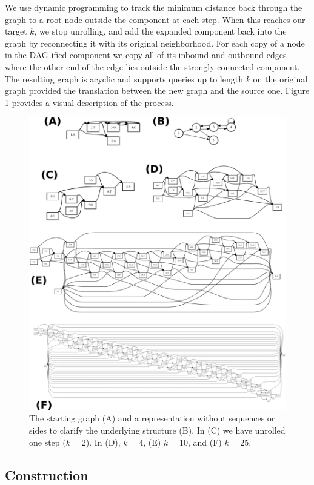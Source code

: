 \documentclass[12pt]{article}
\begin{document}
We use dynamic programming to track the minimum distance back through the graph to a root node outside the component at each step.
When this reaches our target $k$, we stop unrolling, and add the expanded component back into the graph by reconnecting it with its original neighborhood.
For each copy of a node in the DAG-ified component we copy all of its inbound and outbound edges where the other end of the edge lies outside the strongly connected component.
The resulting graph is acyclic and supports queries up to length $k$ on the original graph provided the translation between the new graph and the source one.
Figure \ref{fig:kdagify} provides a visual description of the process.

\begin{figure}[t]
\centering
\includegraphics[width=1.0\textwidth]{figures/kdagify}
\caption{\label{fig:kdagify}
  The starting graph (A) and a representation without sequences or sides to clarify the underlying structure (B).
  In (C) we have unrolled one step ($k = 2$). In (D), $k = 4$, (E) $k = 10$, and (F) $k = 25$.
}
\end{figure}

\subsection{Construction}
\end{document}
